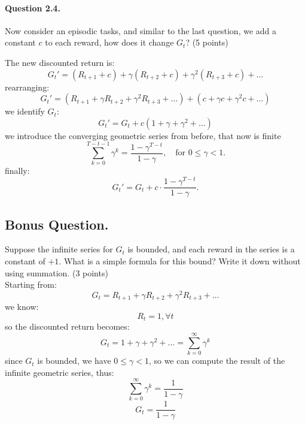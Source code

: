 \documentclass[a4paper,11pt]{article}
\begin{document}
\begin{minipage}{0.9\textwidth}
\vspace{.5cm}
\paragraph{Question 2.4.}
Now consider an episodic tasks, and similar to the last question, we add a constant $c$ to each reward, how does it change $G_t$?
(5 points)
\vspace{.5cm}

The new discounted return is:
\[
G_t' = (R_{t+1} + c) + \gamma (R_{t+2} + c) + \gamma^2 (R_{t+3} + c) + \dots
\]
rearranging:
\[
G_t' = (R_{t+1} + \gamma R_{t+2} + \gamma^2 R_{t+3} + \dots) + (c + \gamma c + \gamma^2 c + \dots)
\]
we identify $G_t$:
\[
G_t' = G_t + c (1 + \gamma + \gamma^2 + \dots)
\]
we introduce the converging geometric series from before, that now is finite
\[
\sum_{k=0}^{T-t-1} \gamma^k = \frac{1 - \gamma^{T-t}}{1 - \gamma}, \quad \text{for } 0 \leq \gamma < 1.
\]
finally:
\[
G_t' = G_t + c \cdot \frac{1 - \gamma^{T-t}}{1 - \gamma}.
\]

\end{minipage}

\newpage
\subsection*{Bonus Question.}
Suppose the infinite series for $G_t$ is bounded, and each reward in the series is a constant of $+1$.
What is a simple formula for this bound? Write it down without using summation.
(3 points)
\vspace{.5cm}
\\
Starting from:
$$
G_t = R_{t+1} + \gamma R_{t+2} + \gamma^2 R_{t+3} + \ldots
$$
we know:
$$
R_t = 1, \forall t
$$
so the discounted return becomes:
\[
G_t =  1 + \gamma + \gamma^2 + \dots = \sum_{k=0}^\infty \gamma^k
\]
since $G_t $ is bounded, we have $ 0 \leq \gamma < 1$, so we can compute the result of the infinite geometric series, thus:
$$
\sum_{k=0}^\infty \gamma^k = \frac{1}{1 - \gamma}
$$
$$
G_t = \frac{1}{1 - \gamma}
$$
\end{document}
